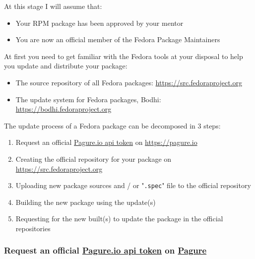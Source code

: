 At this stage I will assume that: 
\begin{itemize}
\item Your RPM package has been approved by your mentor
\item You are now an official member of the Fedora Package Maintainers
\end{itemize}
At first you need to get familiar with the Fedora tools at your disposal to help you update and distribute your package: 
\begin{itemize}
\item The source repository of all Fedora packages: \href{https://src.fedoraproject.org}{https://src.fedoraproject.org}  
\item The update system for Fedora packages, Bodhi: \href{https://bodhi.fedoraproject.org}{https://bodhi.fedoraproject.org}
\end{itemize}
The update process of a Fedora package can be decomposed in 3 steps:
\begin{enumerate}
\item Request an official \href{https://pagure.io/settings/token/new}{Pagure.io api token} on \href{https://pagure.io}{https://pagure.io}
\item Creating the official repository for your package on \href{https://src.fedoraproject.org}{https://src.fedoraproject.org}
\item Uploading new package sources and / or "\texttt{.spec}" file to the official repository
\item Building the new package using the update(s)
\item Requesting for the new built(s) to update the package in the official repositories
\end{enumerate}

\subsubsection{Request an official \href{https://pagure.io/settings/token/new}{Pagure.io api token} on \href{https://pagure.io/}{Pagure}}

